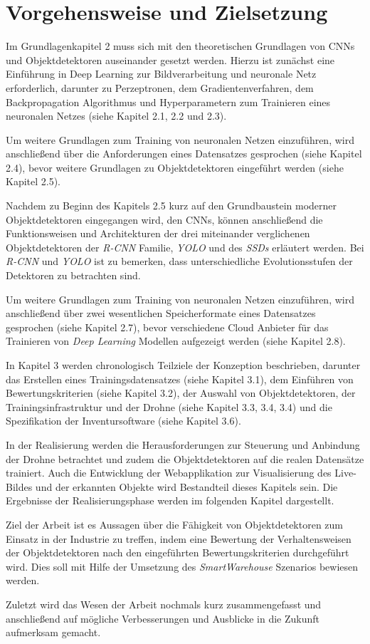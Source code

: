 \section{Vorgehensweise und Zielsetzung}

Im Grundlagenkapitel 2 muss sich mit den theoretischen Grundlagen von CNNs und Objektdetektoren auseinander gesetzt werden. Hierzu ist zunächst eine Einführung in Deep Learning zur Bildverarbeitung und neuronale Netz erforderlich, darunter zu Perzeptronen, dem Gradientenverfahren, dem Backpropagation Algorithmus und Hyperparametern zum Trainieren eines neuronalen Netzes (siehe Kapitel 2.1, 2.2 und 2.3). 

Um weitere Grundlagen zum Training von neuronalen Netzen einzuführen, wird anschließend über die Anforderungen eines Datensatzes gesprochen (siehe Kapitel 2.4), bevor weitere Grundlagen zu Objektdetektoren eingeführt werden (siehe Kapitel 2.5). 

Nachdem zu Beginn des Kapitels 2.5 kurz auf den Grundbaustein moderner Objektdetektoren eingegangen wird, den CNNs, können anschließend die Funktionsweisen und Architekturen der drei miteinander verglichenen Objektdetektoren der \textit{R-CNN} Familie, \textit{YOLO} und des \textit{SSDs} erläutert werden. Bei \textit{R-CNN} und \textit{YOLO} ist zu bemerken, dass unterschiedliche Evolutionsstufen der Detektoren zu betrachten sind.

Um weitere Grundlagen zum Training von neuronalen Netzen einzuführen, wird anschließend über zwei wesentlichen Speicherformate eines Datensatzes gesprochen (siehe Kapitel 2.7), bevor verschiedene Cloud Anbieter für das Trainieren von \textit{Deep Learning} Modellen aufgezeigt werden (siehe Kapitel 2.8). 

In Kapitel 3 werden chronologisch Teilziele der Konzeption beschrieben, darunter das Erstellen eines Trainingsdatensatzes (siehe Kapitel 3.1), dem Einführen von Bewertungskriterien (siehe Kapitel 3.2), der Auswahl von Objektdetektoren, der Trainingsinfrastruktur und der Drohne (siehe Kapitel 3.3, 3.4, 3.4) und die Spezifikation der Inventursoftware (siehe Kapitel 3.6).

In der Realisierung werden die Herausforderungen zur Steuerung und Anbindung der Drohne betrachtet und zudem die Objektdetektoren auf die realen Datensätze trainiert. Auch die Entwicklung der Webapplikation zur Visualisierung des Live-Bildes und der erkannten Objekte wird Bestandteil dieses Kapitels sein. Die Ergebnisse der Realisierungsphase werden im folgenden Kapitel dargestellt. 

Ziel der Arbeit ist es Aussagen über die Fähigkeit von Objektdetektoren zum Einsatz in der Industrie zu treffen, indem eine Bewertung der Verhaltensweisen der Objektdetektoren nach den eingeführten Bewertungskriterien durchgeführt wird. Dies soll mit Hilfe der Umsetzung des \textit{SmartWarehouse} Szenarios bewiesen werden.

Zuletzt wird das Wesen der Arbeit nochmals kurz zusammengefasst und anschließend auf mögliche Verbesserungen und Ausblicke in die Zukunft aufmerksam gemacht. 
